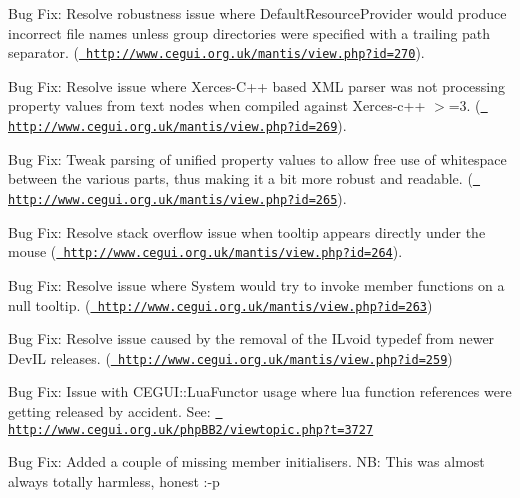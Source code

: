\begin{DoxyItemize}
\item Bug Fix\+: Resolve robustness issue where Default\+Resource\+Provider would produce incorrect file names unless group directories were specified with a trailing path separator. (\href{http://www.cegui.org.uk/mantis/view.php?id=270}{\texttt{ http\+://www.\+cegui.\+org.\+uk/mantis/view.\+php?id=270}}).
\item Bug Fix\+: Resolve issue where Xerces-\/\+C++ based X\+ML parser was not processing property values from text nodes when compiled against Xerces-\/c++ $>$=3. (\href{http://www.cegui.org.uk/mantis/view.php?id=269}{\texttt{ http\+://www.\+cegui.\+org.\+uk/mantis/view.\+php?id=269}}).
\item Bug Fix\+: Tweak parsing of unified property values to allow free use of whitespace between the various parts, thus making it a bit more robust and readable. (\href{http://www.cegui.org.uk/mantis/view.php?id=265}{\texttt{ http\+://www.\+cegui.\+org.\+uk/mantis/view.\+php?id=265}}).
\item Bug Fix\+: Resolve stack overflow issue when tooltip appears directly under the mouse (\href{http://www.cegui.org.uk/mantis/view.php?id=264}{\texttt{ http\+://www.\+cegui.\+org.\+uk/mantis/view.\+php?id=264}}).
\item Bug Fix\+: Resolve issue where System would try to invoke member functions on a null tooltip. (\href{http://www.cegui.org.uk/mantis/view.php?id=263}{\texttt{ http\+://www.\+cegui.\+org.\+uk/mantis/view.\+php?id=263}})
\item Bug Fix\+: Resolve issue caused by the removal of the I\+Lvoid typedef from newer Dev\+IL releases. (\href{http://www.cegui.org.uk/mantis/view.php?id=259}{\texttt{ http\+://www.\+cegui.\+org.\+uk/mantis/view.\+php?id=259}})
\item Bug Fix\+: Issue with C\+E\+G\+U\+I\+::\+Lua\+Functor usage where lua function references were getting released by accident. See\+: \href{http://www.cegui.org.uk/phpBB2/viewtopic.php?t=3727}{\texttt{ http\+://www.\+cegui.\+org.\+uk/php\+B\+B2/viewtopic.\+php?t=3727}}
\item Bug Fix\+: Added a couple of missing member initialisers. NB\+: This was almost always totally harmless, honest \+:-\/p
\end{DoxyItemize}


